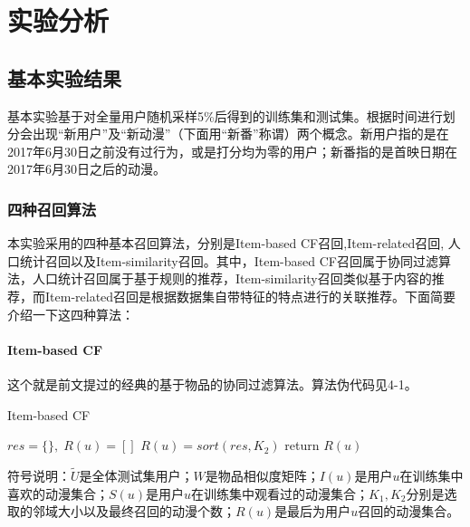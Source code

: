 
\chapter{实验分析}
  \section{基本实验结果}
  基本实验基于对全量用户随机采样5\%后得到的训练集和测试集。根据时间进行划分会出现“新用户”及“新动漫”（下面用“新番”称谓）两个概念。新用户指的是在2017年6月30日之前没有过行为，或是打分均为零的用户；新番指的是首映日期在2017年6月30日之后的动漫。
    \subsection{四种召回算法}
    本实验采用的四种基本召回算法，分别是Item-based CF召回,Item-related召回, 人口统计召回以及Item-similarity召回。其中，Item-based CF召回属于协同过滤算法，人口统计召回属于基于规则的推荐，Item-similarity召回类似基于内容的推荐，而Item-related召回是根据数据集自带特征的特点进行的关联推荐。下面简要介绍一下这四种算法：
      \subsubsection{Item-based CF}
      这个就是前文提过的经典的基于物品的协同过滤算法\cite{wang2006unifying}。算法伪代码见4-1。
      \begin{algorithm}[htbp]
        \caption{Item-based CF}
        $res=\{\},\;R(u)=[]$\;
        $R(u)=sort(res,K_2)$\;
        return $R(u)$\;
      \end{algorithm}
      符号说明：$\tilde{U}$是全体测试集用户；$W$是物品相似度矩阵；$I(u)$是用户$u$在训练集中喜欢的动漫集合；$S(u)$是用户$u$在训练集中观看过的动漫集合；$K_1,K_2$分别是选取的邻域大小以及最终召回的动漫个数；$R(u)$是最后为用户$u$召回的动漫集合。

